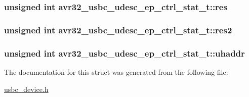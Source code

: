 \label{structavr32__usbc__udesc__ep__ctrl__stat__t_ace686bb729b57a30131cd73b536ece96}
\hypertarget{structavr32__usbc__udesc__ep__ctrl__stat__t_a834d36229bda069c7d36504f45bd917b}{
\subsubsection[{res}]{\setlength{\rightskip}{0pt plus 5cm}unsigned int {\bf avr32\-\_\-usbc\-\_\-udesc\-\_\-ep\-\_\-ctrl\-\_\-stat\-\_\-t\-::res}}}
\label{structavr32__usbc__udesc__ep__ctrl__stat__t_a834d36229bda069c7d36504f45bd917b}
\hypertarget{structavr32__usbc__udesc__ep__ctrl__stat__t_af88c1fe164150c905432dc87aa03d84a}{
\subsubsection[{res2}]{\setlength{\rightskip}{0pt plus 5cm}unsigned int {\bf avr32\-\_\-usbc\-\_\-udesc\-\_\-ep\-\_\-ctrl\-\_\-stat\-\_\-t\-::res2}}}
\label{structavr32__usbc__udesc__ep__ctrl__stat__t_af88c1fe164150c905432dc87aa03d84a}
\hypertarget{structavr32__usbc__udesc__ep__ctrl__stat__t_a22eed9d1aca4da507f8927d8db4f73fe}{
\subsubsection[{uhaddr}]{\setlength{\rightskip}{0pt plus 5cm}unsigned int {\bf avr32\-\_\-usbc\-\_\-udesc\-\_\-ep\-\_\-ctrl\-\_\-stat\-\_\-t\-::uhaddr}}}
\label{structavr32__usbc__udesc__ep__ctrl__stat__t_a22eed9d1aca4da507f8927d8db4f73fe}


\-The documentation for this struct was generated from the following file\-:\begin{DoxyCompactItemize}
\item 
\hyperlink{usbc__device_8h}{usbc\-\_\-device.\-h}\end{DoxyCompactItemize}
